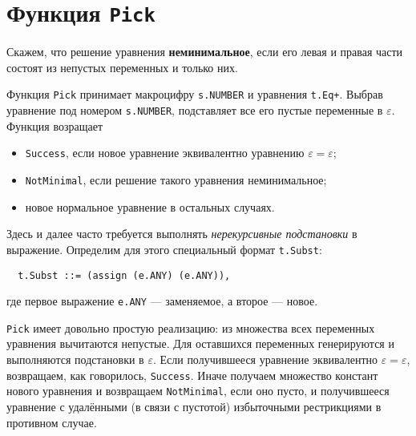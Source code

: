\documentclass[12pt]{article}
\begin{document}
\section{Функция \texttt{Pick}}

Скажем, что решение уравнения \textbf{неминимальное}, если его левая и правая
части состоят из непустых переменных и только них.

Функция \texttt{Pick} принимает макроцифру \texttt{s.NUMBER} и уравнения
\texttt{t.Eq+}. Выбрав уравнение под номером \texttt{s.NUMBER}, подставляет
все его пустые переменные в $\varepsilon$. Функция возращает
\begin{itemize}
  \item \texttt{Success}, если новое уравнение эквивалентно уравнению
  $\varepsilon = \varepsilon$;
\item \texttt{NotMinimal}, если решение такого уравнения неминимальное;
\item новое нормальное уравнение в остальных случаях.
\end{itemize}

Здесь и далее часто требуется выполнять \textit{нерекурсивные подстановки} в
выражение. Определим для этого специальный формат \texttt{t.Subst}:
\begin{Verbatim}
  t.Subst ::= (assign (e.ANY) (e.ANY)),
\end{Verbatim}
где первое выражение \texttt{e.ANY} --- заменяемое, а второе --- новое.

\texttt{Pick} имеет довольно простую реализацию: из множества всех переменных
уравнения вычитаются непустые. Для оставшихся переменных генерируются
и выполняются подстановки в $\varepsilon$. Если получившееся уравнение
эквивалентно $\varepsilon = \varepsilon$, возвращаем, как говорилось,
\texttt{Success}. Иначе получаем множество констант нового уравнения и
возвращаем \texttt{NotMinimal}, если оно пусто, и получившееся уравнение с
удалёнными (в связи с пустотой) избыточными рестрикциями в противном случае.
\end{document}
